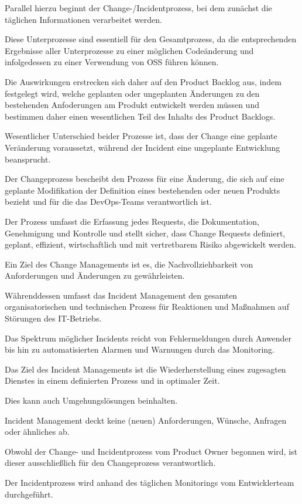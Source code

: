 Parallel hierzu beginnt der Change-/Incidentprozess, bei dem zunächst die täglichen Informationen verarbeitet werden. 

Diese Unterprozesse sind essentiell für den Gesamtprozess, da die entsprechenden Ergebnisse aller Unterprozesse zu einer möglichen Codeänderung und infolgedessen zu einer Verwendung von OSS führen können. 

Die Auswirkungen erstrecken sich daher auf den Product Backlog aus, indem festgelegt wird, welche geplanten oder ungeplanten Änderungen zu den bestehenden Anfoderungen am Produkt entwickelt werden müssen und bestimmen daher einen wesentlichen Teil des Inhalts des Product Backlogs.  

Wesentlicher Unterschied beider Prozesse ist, dass der Change eine geplante Veränderung voraussetzt, während der Incident eine ungeplante Entwicklung beansprucht.  

Der Changeprozess bescheibt den Prozess für eine Änderung, die sich auf eine geplante Modifikation der Definition eines bestehenden oder neuen Produkts bezieht und für die das DevOps-Teams verantwortlich ist. 

Der Prozess umfasst die Erfassung jedes Requests, die Dokumentation, Genehmigung und Kontrolle und stellt sicher, dass Change Requests definiert, geplant, effizient, wirtschaftlich und mit vertretbarem Risiko abgewickelt werden. 

Ein Ziel des Change Managements ist es, die Nachvollziehbarkeit von Anforderungen und Änderungen zu gewährleisten.

Währenddessen umfasst das Incident Management den gesamten organisatorischen und technischen Prozess für Reaktionen und Maßnahmen auf Störungen des IT-Betriebs.

Das Spektrum möglicher Incidents reicht von Fehlermeldungen durch Anwender bis hin zu automatisierten Alarmen und Warnungen durch das Monitoring.

Das Ziel des Incident Managements ist die Wiederherstellung eines zugesagten Dienstes in einem definierten Prozess und in optimaler Zeit. 

Dies kann auch Umgehungslösungen beinhalten. 

Incident Management deckt keine (neuen) Anforderungen, Wünsche, Anfragen oder ähnliches ab.  

Obwohl der Change- und Incidentprozess vom Product Owner begonnen wird, ist dieser ausschließlich für den Changeprozess verantwortlich. 

Der Incidentprozess wird anhand des täglichen Monitorings vom Entwicklerteam durchgeführt. 

